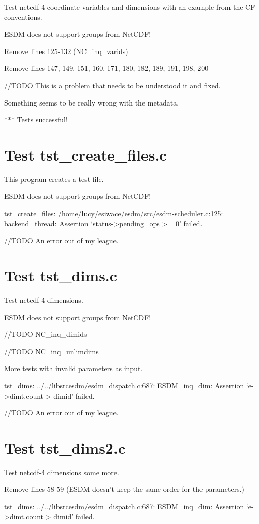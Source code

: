 Test netcdf-4 coordinate variables and dimensions with an example from the CF conventions.

ESDM does not support groups from NetCDF!

Remove lines 125-132 (NC\_inq\_varids)

Remove lines 147, 149, 151, 160, 171, 180, 182, 189, 191, 198, 200

//TODO This is a problem that needs to be understood it and fixed.

Something seems to be really wrong with the metadata.

*** Tests successful!

\section{Test tst\_create\_files.c}

This program creates a test file.

ESDM does not support groups from NetCDF!

tst\_create\_files: /home/lucy/esiwace/esdm/src/esdm-scheduler.c:125: backend\_thread: Assertion `status->pending\_ops >= 0' failed.

//TODO An error out of my league.

\section{Test tst\_dims.c}

Test netcdf-4 dimensions.

ESDM does not support groups from NetCDF!

//TODO NC\_inq\_dimids

//TODO NC\_inq\_unlimdims

More tests with invalid parameters as input.

tst\_dims: ../../libsrcesdm/esdm\_dispatch.c:687: ESDM\_inq\_dim: Assertion `e->dimt.count > dimid' failed.

//TODO An error out of my league.

\section{Test tst\_dims2.c}

Test netcdf-4 dimensions some more.

Remove lines 58-59 (ESDM doesn't keep the same order for the parameters.)

tst\_dims: ../../libsrcesdm/esdm\_dispatch.c:687: ESDM\_inq\_dim: Assertion `e->dimt.count > dimid' failed.


